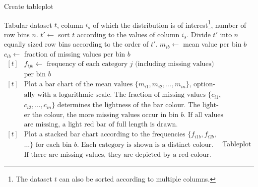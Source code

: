\documentclass[11pt, fleqn, a4paper]{article}\usepackage{graphicx, color}
\begin{document}
\begin{algorithm}[h]
\caption{Create tableplot}\label{alg}
\begin{minipage}{0.8\textwidth}
\begin{algorithmic}[1]
\Require Tabular dataset $t$, column $i_s$ of which the distribution is of interest\footnote{The dataset $t$ can also be sorted according to multiple columns.}, number of row bins $n$.
\State $t'\leftarrow$ sort $t$ according to the values of column $i_s$.
\State Divide $t'$ into $n$ equally sized row bins according to the order of $t'$.
\State $m_{ib}\leftarrow$ mean value per bin $b$
\State $c_{ib}\leftarrow$ fraction of missing values per bin $b$
\EndIf
{}
\State $\begin{aligned}[t]
		&\mbox{$f_{ijb}\leftarrow$ frequency of each category $j$ (including missing values)}\\[-3pt]
		&\mbox{per bin $b$}
	\end{aligned}$
\EndIf
\EndFor
{}
\State $\begin{aligned}[t]
		&\mbox{Plot a bar chart of the mean values $\{m_{i1}, m_{i2},\ldots, m_{in}\}$, option-}\\[-3pt]
		&\mbox{ally with a logarithmic scale. The fraction of missing values $\{c_{i1},$}\\[-3pt]
		&\mbox{$c_{i2},\ldots, c_{in}\}$ determines the lightness of the bar colour. The light-}\\[-3pt]
		&\mbox{er the colour, the more missing values occur in bin $b$. If all values}\\[-3pt]
		&\mbox{are missing, a light red bar of full length is drawn.}
	\end{aligned}$
\EndIf
{}
\State $\begin{aligned}[t]
		&\mbox{Plot a stacked bar chart according to the frequencies $\{f_{i1b}, f_{i2b},$}\\[-3pt]
		&\mbox{$\ldots\}$ for each bin $b$. Each category is shown is a distinct colour.}\\[-3pt]
		&\mbox{If there are missing values, they are depicted by a red colour.}
	\end{aligned}$
\EndIf
\EndFor
\Ensure Tableplot
\end{algorithmic}
\end{minipage}
\end{algorithm}
\end{document}
